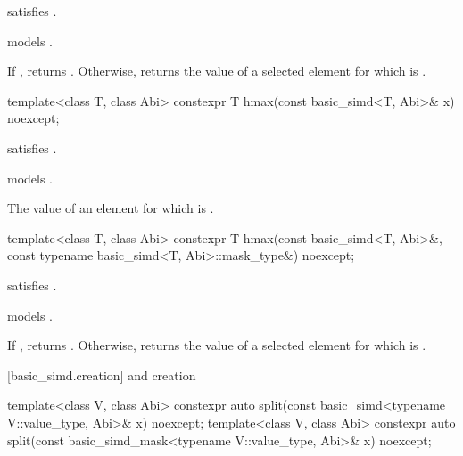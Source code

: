 \begin{itemdescr}
  \pnum\constraints
   satisfies .

  \pnum\expects
   models .

  \pnum\returns
  If , returns .
  Otherwise, returns the value of a selected element  for which  is  \forallmaskedi.
\end{itemdescr}

\begin{itemdecl}
template<class T, class Abi> constexpr T hmax(const basic_simd<T, Abi>& x) noexcept;
\end{itemdecl}

\begin{itemdescr}
  \pnum\constraints
   satisfies .

  \pnum\expects
   models .

  \pnum\returns
  The value of an element  for which  is  \foralli.
\end{itemdescr}

\begin{itemdecl}
template<class T, class Abi>
  constexpr T hmax(const basic_simd<T, Abi>&, const typename basic_simd<T, Abi>::mask_type&) noexcept;
\end{itemdecl}

\begin{itemdescr}
  \pnum\constraints
   satisfies .

  \pnum\expects
   models .

  \pnum\returns
  If , returns .
  Otherwise, returns the value of a selected element  for which  is  \forallmaskedi.
\end{itemdescr}

[basic_simd.creation]{ and  creation}

\begin{itemdecl}
  template<class V, class Abi>
    constexpr auto split(const basic_simd<typename V::value_type, Abi>& x) noexcept;
  template<class V, class Abi>
    constexpr auto split(const basic_simd_mask<typename V::value_type, Abi>& x) noexcept;
  \end{itemdecl}

